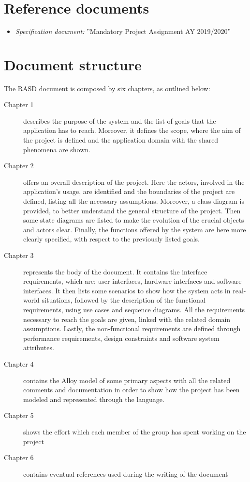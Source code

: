 		\section{Reference documents}
			\begin{itemize}
				\item \textit{Specification document:} ''Mandatory Project Assignment AY 2019/2020''
			\end{itemize}
		\section{Document structure}
			\paragraph{}
				The RASD document is composed by six chapters, as outlined below:
			\begin{description}
				\item[Chapter 1] describes the purpose of the system and the list of goals that the application has to reach. Moreover, it defines the scope, where the aim of the project is defined and the application domain with the shared phenomena are shown.
				\item[Chapter 2] offers an overall description of the project. Here the actors, involved in the application's usage, are identified and the boundaries of the project are defined, listing all the necessary assumptions. Moreover, a class diagram is provided, to better understand the general structure of the project. Then some state diagrams are listed to make the evolution of the crucial objects and actors clear. Finally, the functions offered by the system are here more clearly specified, with respect to the previously listed goals.
				\item[Chapter 3] represents the body of the document. It contains the interface requirements, which are: user interfaces, hardware interfaces and software interfaces. It then lists some scenarios to show how the system acts in real-world situations, followed by the description of the functional requirements, using use cases and sequence diagrams. All the requirements necessary to reach the goals are given, linked with the related domain assumptions. Lastly, the non-functional requirements are defined through performance requirements, design constraints and software system attributes.
				\item[Chapter 4] contains the Alloy model of some primary aspects with all the related comments and documentation in order to show how the project has been modeled and represented through the language.
				\item[Chapter 5] shows the effort which each member of the group has spent working on the project
				\item[Chapter 6] contains eventual references used during the writing of the document
			\end{description}